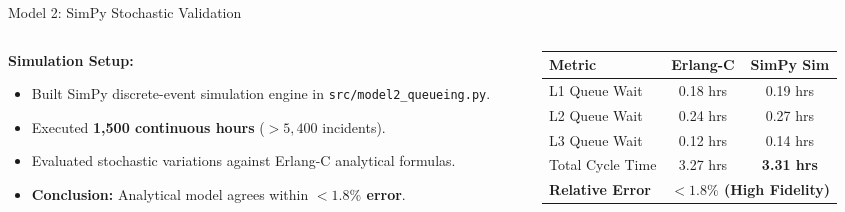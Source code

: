 \documentclass[10pt,aspectratio=169]{beamer}
\begin{document}
\begin{frame}{Model 2: SimPy Stochastic Validation}
    \begin{columns}[c]
        \begin{column}{0.50\textwidth}
            \textbf{Simulation Setup:}
            \vspace{0.2cm}
            \begin{itemize}
                \setlength\itemsep{0.6em}
                \item Built SimPy discrete-event simulation engine in \texttt{src/model2\_queueing.py}.
                \item Executed \textbf{1,500 continuous hours} ($>5,400$ incidents).
                \item Evaluated stochastic variations against Erlang-C analytical formulas.
                \item \textbf{Conclusion:} Analytical model agrees within \textbf{$<1.8\%$ error}.
            \end{itemize}
        \end{column}
        \begin{column}{0.46\textwidth}
            \centering
            \small
            \begin{tabular}{lcc}
                \toprule
                \textbf{Metric} & \textbf{Erlang-C} & \textbf{SimPy Sim} \\
                \midrule
                L1 Queue Wait & 0.18 hrs & 0.19 hrs \\
                L2 Queue Wait & 0.24 hrs & 0.27 hrs \\
                L3 Queue Wait & 0.12 hrs & 0.14 hrs \\
                Total Cycle Time & 3.27 hrs & \textbf{3.31 hrs} \\
                \midrule
                \textbf{Relative Error} & \multicolumn{2}{c}{\textbf{$< 1.8\%$ (High Fidelity)}} \\
                \bottomrule
            \end{tabular}
        \end{column}
    \end{columns}
\end{frame}
\end{document}
